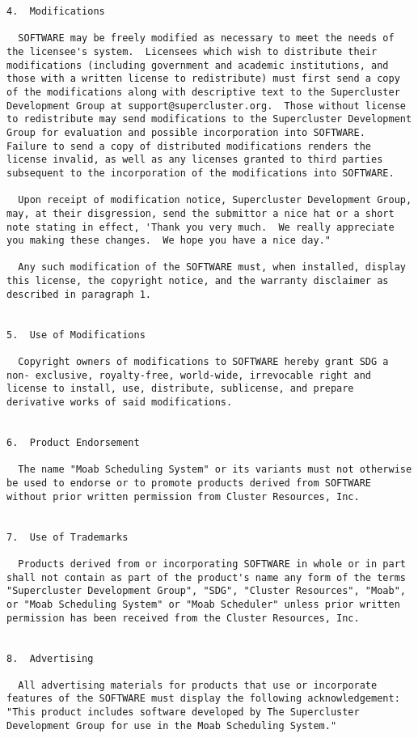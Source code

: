 \begin{verbatim}
4.  Modifications

  SOFTWARE may be freely modified as necessary to meet the needs of
the licensee's system.  Licensees which wish to distribute their
modifications (including government and academic institutions, and
those with a written license to redistribute) must first send a copy
of the modifications along with descriptive text to the Supercluster
Development Group at support@supercluster.org.  Those without license
to redistribute may send modifications to the Supercluster Development
Group for evaluation and possible incorporation into SOFTWARE.
Failure to send a copy of distributed modifications renders the
license invalid, as well as any licenses granted to third parties
subsequent to the incorporation of the modifications into SOFTWARE.

  Upon receipt of modification notice, Supercluster Development Group,
may, at their disgression, send the submittor a nice hat or a short
note stating in effect, 'Thank you very much.  We really appreciate
you making these changes.  We hope you have a nice day."

  Any such modification of the SOFTWARE must, when installed, display
this license, the copyright notice, and the warranty disclaimer as
described in paragraph 1.


5.  Use of Modifications

  Copyright owners of modifications to SOFTWARE hereby grant SDG a
non- exclusive, royalty-free, world-wide, irrevocable right and
license to install, use, distribute, sublicense, and prepare
derivative works of said modifications.


6.  Product Endorsement

  The name "Moab Scheduling System" or its variants must not otherwise
be used to endorse or to promote products derived from SOFTWARE
without prior written permission from Cluster Resources, Inc.


7.  Use of Trademarks

  Products derived from or incorporating SOFTWARE in whole or in part
shall not contain as part of the product's name any form of the terms
"Supercluster Development Group", "SDG", "Cluster Resources", "Moab",
or "Moab Scheduling System" or "Moab Scheduler" unless prior written
permission has been received from the Cluster Resources, Inc.


8.  Advertising

  All advertising materials for products that use or incorporate
features of the SOFTWARE must display the following acknowledgement:
"This product includes software developed by The Supercluster
Development Group for use in the Moab Scheduling System."



\end{verbatim}
